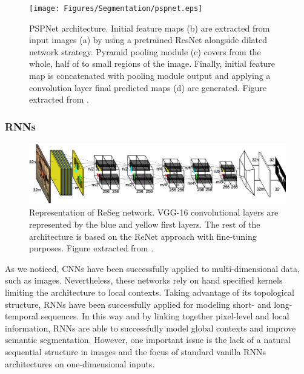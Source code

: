\begin{figure}[!hbt]
	\centering
	\texttt{[image: Figures/Segmentation/pspnet.eps]}
	\caption{\acs{PSPNet} architecture. Initial feature maps (b) are extracted from input images (a) by using a pretrained ResNet \cite{He2016} alongside dilated network strategy. Pyramid pooling module (c) covers from the whole, half of to small regions of the image. Finally, initial feature map is concatenated with pooling module output and applying a convolution layer final predicted maps (d) are generated. Figure extracted from \cite{Zhao2016}.}
	\label{fig:semseg:pspnet}
\end{figure}

\subsubsection{\aclp{RNN}}

\begin{figure}[!t]
	\centering
	\includegraphics[width=\linewidth]{Figures/Segmentation/reseg_base.eps}
	\caption{Representation of ReSeg network. VGG-16 convolutional layers are represented by the blue and yellow first layers. The rest of the architecture is based on the ReNet approach with fine-tuning purposes. Figure extracted from \cite{Visin2016}.}
	\label{fig:semseg:reseg-network}
\end{figure}

As we noticed, \acp{CNN} have been successfully applied to multi-dimensional data, such as images. Nevertheless, these networks rely on hand specified kernels limiting the architecture to local contexts. Taking advantage of its topological structure, \aclp{RNN} have been successfully applied for modeling short- and long-temporal sequences. In this way and by linking together pixel-level and local information, \acp{RNN} are able to successfully model global contexts and improve semantic segmentation. However, one important issue is the lack of a natural sequential structure in images and the focus of standard vanilla \acp{RNN} architectures on one-dimensional inputs.  
	
